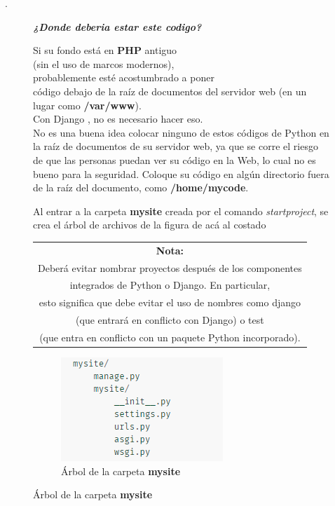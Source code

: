 \documentclass[10pt]{article}
\newcommand{\py}[1]{{\textcolor{B}{Python} #1}}
\newcommand{\django}[1]{{\textcolor{G}{Django} #1}}
\begin{document}
.


\begin{figure}[H]
	\begin{minipage}[b]{0.4\linewidth}
		\centering
		\textbf{\textit{¿Donde deberia estar este codigo?}}
			
Si su fondo está en \textbf{PHP} antiguo \\(sin el uso de marcos modernos),\\ probablemente esté acostumbrado a poner\\ código debajo de la raíz de documentos del servidor web (en un lugar como \textbf{/var/www}). \\
 Con \django{}, no es necesario hacer eso.\\ No es una buena idea colocar ninguno de estos códigos de \py{} en la raíz de documentos de su servidor web, ya que se corre el riesgo de que las personas puedan ver su código en la Web, lo cual no es bueno para la seguridad. Coloque su código en algún directorio fuera de la raíz del documento, como \textbf{/home/mycode}.

Al entrar a la carpeta \textbf{mysite} creada por el comando \textit{startproject}, se crea el árbol de archivos de la figura de acá al costado	
		\end{minipage}
		\hspace{0.5cm}	
	\begin{minipage}[b]{0.5\linewidth}
		\centering
		\begin{table}[H]
			\begin{tabular}{|c|}
	\hline \textbf{Nota:} \\
Deberá evitar nombrar proyectos después de los componentes\\ integrados de \py{} o Django. En particular,\\ esto significa que debe evitar el uso de nombres como django\\ (que entrará en conflicto con Django) o test\\ (que entra en conflicto con un paquete Python incorporado).\\ \hline 	
			\end{tabular}
		\end{table}
\begin{figure}[H]
  \begin{center}
  	 \includegraphics{figuras/311/img1.png}	 
	 \renewcommand{\arraystretch}{1.3}
	 \caption{Árbol de la carpeta \textbf{mysite}}
  \end{center}
\end{figure}
	\end{minipage}
\end{figure} 
\color{black}{}
\end{document}
